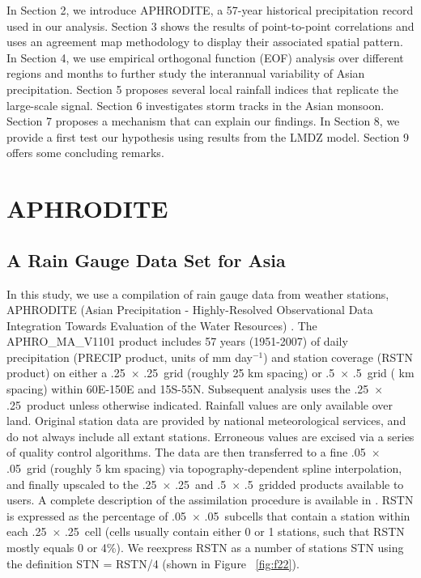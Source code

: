 	In Section 2, we introduce APHRODITE, a 57-year historical precipitation record used in our analysis. Section 3 shows the results of point-to-point correlations and uses an agreement map methodology to display their associated spatial pattern. In Section 4, we use empirical orthogonal function (EOF) analysis over different regions and months to further study the interannual variability of Asian precipitation. Section 5 proposes several local rainfall indices that replicate the large-scale signal. Section 6 investigates storm tracks in the Asian monsoon. Section 7 proposes a mechanism that can explain our findings. In Section 8, we provide a first test our hypothesis using results from the LMDZ model. Section 9 offers some concluding remarks.
	
\section{APHRODITE}

\subsection{A Rain Gauge Data Set for Asia}

	In this study, we use a compilation of rain gauge data from weather stations, APHRODITE (Asian Precipitation - Highly-Resolved Observational Data Integration Towards Evaluation of the Water Resources) \citep{Yatagai2012}. The APHRO\_MA\_V1101 product includes 57 years (1951-2007) of daily precipitation (PRECIP product, units of mm day$^{-1}$) and station coverage (RSTN product) on either a .25\textdegree\ $\times$ .25\textdegree\ grid (roughly 25 km spacing) or .5\textdegree\ $\times$ .5\textdegree\ grid ( km spacing) within 60\textdegree E-150\textdegree E and 15\textdegree S-55\textdegree N. Subsequent analysis uses the .25\textdegree\ $\times$ .25\textdegree\ product unless otherwise indicated. Rainfall values are only available over land. Original station data are provided by national meteorological services, and do not always include all extant stations. Erroneous values are excised via a series of quality control algorithms. The data are then transferred to a fine .05\textdegree\ $\times$ .05\textdegree\ grid (roughly 5 km spacing) via topography-dependent spline interpolation, and finally upscaled to the .25\textdegree\ $\times$ .25\textdegree\ and .5\textdegree\ $\times$ .5\textdegree\ gridded products available to users. A complete description of the assimilation procedure is available in  \cite{Yatagai2012}. RSTN is expressed as the percentage of .05\textdegree\ $\times$ .05\textdegree\ subcells that contain a station within each .25\textdegree\ $\times$ .25\textdegree\ cell (cells usually contain either 0 or 1 stations, such that RSTN mostly equals 0 or 4\%). We reexpress RSTN as a number of stations STN using the definition STN = RSTN/4 (shown in Figure ~\ref{fig:f22}).
	
